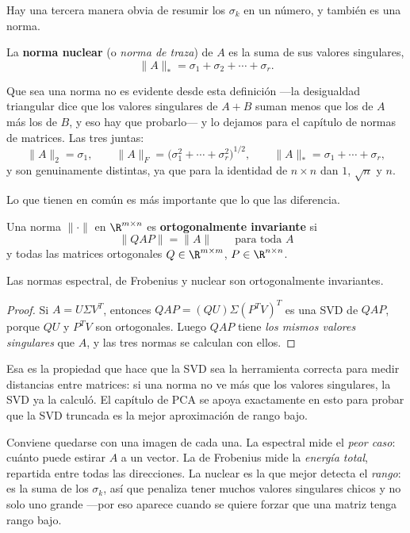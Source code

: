 Hay una tercera manera obvia de resumir los $\sigma_k$ en un número, y
también es una norma.

\begin{definition}\label{def:norma-nuclear}
La \textbf{norma nuclear} (o \emph{norma de traza}) de $A$ es la suma de sus
valores singulares,
\[
\|A\|_*=\sigma_1+\sigma_2+\cdots+\sigma_r .
\]
\end{definition}

Que sea una norma no es evidente desde esta definición ---la desigualdad
triangular dice que los valores singulares de $A+B$ suman menos que los de
$A$ más los de $B$, y eso hay que probarlo--- y lo dejamos para el capítulo
de normas de matrices. Las tres juntas:
\[
\|A\|_2=\sigma_1,\qquad
\|A\|_F=\bigl(\sigma_1^2+\cdots+\sigma_r^2\bigr)^{1/2},\qquad
\|A\|_*=\sigma_1+\cdots+\sigma_r ,
\]
y son genuinamente distintas, ya que para la identidad de $n\times n$ dan
$1$, $\sqrt n$ y $n$.

Lo que tienen en común es más importante que lo que las diferencia.

\begin{definition}\label{def:ortog-invariante}
Una norma $\|\cdot\|$ en $\R^{m\times n}$ es \textbf{ortogonalmente
invariante} si
\[
\|QAP\|=\|A\| \qquad\text{para toda } A
\]
y todas las matrices ortogonales $Q\in\R^{m\times m}$, $P\in\R^{n\times n}$.
\end{definition}

\begin{corollary}\label{coro:tres-invariantes}
Las normas espectral, de Frobenius y nuclear son ortogonalmente invariantes.
\end{corollary}

\begin{proof}
Si $A=U\Sigma V^T$, entonces $QAP=(QU)\Sigma(P^TV)^T$ es una SVD de $QAP$,
porque $QU$ y $P^TV$ son ortogonales. Luego $QAP$ tiene \emph{los mismos
valores singulares} que $A$, y las tres normas se calculan con ellos.
\end{proof}

Esa es la propiedad que hace que la SVD sea la herramienta correcta para
medir distancias entre matrices: si una norma no ve más que los valores
singulares, la SVD ya la calculó. El capítulo de PCA se apoya exactamente en
esto para probar que la SVD truncada es la mejor aproximación de rango bajo.

\begin{remark}
Conviene quedarse con una imagen de cada una. La espectral mide el
\emph{peor caso}: cuánto puede estirar $A$ a un vector. La de Frobenius mide
la \emph{energía total}, repartida entre todas las direcciones. La nuclear
es la que mejor detecta el \emph{rango}: es la suma de los $\sigma_k$, así
que penaliza tener muchos valores singulares chicos y no solo uno grande ---por
eso aparece cuando se quiere forzar que una matriz tenga rango bajo.
\end{remark}


